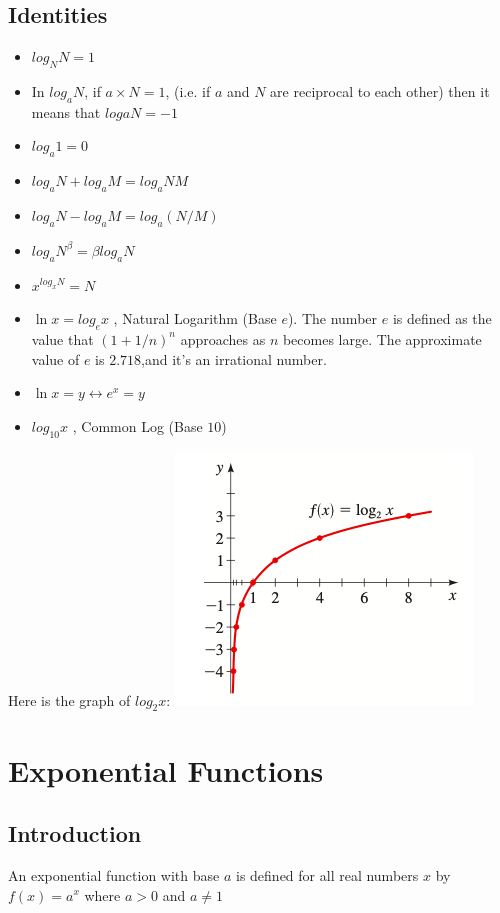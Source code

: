 \documentclass{book}
\begin{document}
	\section{Identities}
	
	\begin{itemize}
		\item $log_NN = 1$
		\item In $log_aN$, if $a \times N =1$, (i.e. if $a$ and $N$ are reciprocal to each other) then it means that $logaN = -1$ 
		\item $log_a1 = 0$
		\item $log_aN + log_aM = log_a{NM}$
		\item $log_aN - log_aM = log_a{(N/M)}$
		\item $log_aN^\beta = \beta log_aN$
		\item$x^{log_xN} = N$
		\item $\ln x = log_ex$ , Natural Logarithm (Base $e$). The number $e$ is defined as the value that $(1 + 1/n)^n$ approaches as $n$ becomes large. The approximate value of $e$ is $2.718$,and it's an irrational number.
		\item $\ln x = y \leftrightarrow e^x = y$
		\item $log_{10}x$ , Common Log (Base $10$)
	\end{itemize}
	
	Here is the graph of $log_2x$: 
	\includegraphics[scale=0.6]{loggraph}

	\chapter{Exponential Functions}
	
	\section{Introduction}
	\begin{mdframed}[backgroundcolor=yellow]
		An exponential function with base $a$ is defined for all real numbers $x$ by $f(x) = a^x$ where $a>0$ and $a \neq 1$
	\end{mdframed}
	
\end{document}
